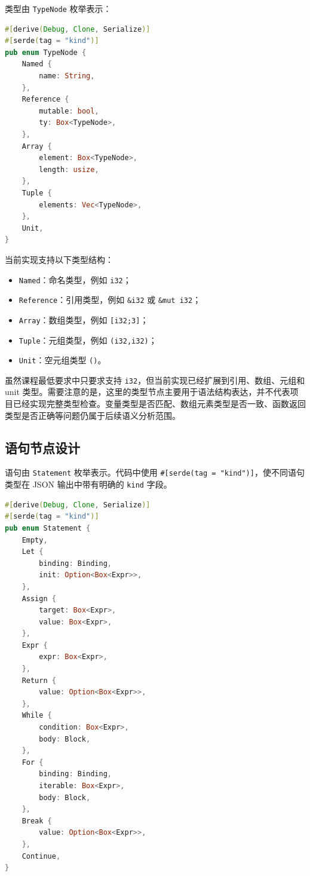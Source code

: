 \documentclass[UTF8,a4paper,12pt]{ctexart}
\begin{document}
类型由 \texttt{TypeNode} 枚举表示：

\begin{lstlisting}[language=Rust,caption={TypeNode 节点定义}]
#[derive(Debug, Clone, Serialize)]
#[serde(tag = "kind")]
pub enum TypeNode {
    Named {
        name: String,
    },
    Reference {
        mutable: bool,
        ty: Box<TypeNode>,
    },
    Array {
        element: Box<TypeNode>,
        length: usize,
    },
    Tuple {
        elements: Vec<TypeNode>,
    },
    Unit,
}
\end{lstlisting}

当前实现支持以下类型结构：

\begin{itemize}
    \item \texttt{Named}：命名类型，例如 \texttt{i32}；
    \item \texttt{Reference}：引用类型，例如 \texttt{\&i32} 或 \texttt{\&mut i32}；
    \item \texttt{Array}：数组类型，例如 \texttt{[i32;3]}；
    \item \texttt{Tuple}：元组类型，例如 \texttt{(i32,i32)}；
    \item \texttt{Unit}：空元组类型 \texttt{()}。
\end{itemize}

虽然课程最低要求中只要求支持 \texttt{i32}，但当前实现已经扩展到引用、数组、元组和 unit 类型。需要注意的是，这里的类型节点主要用于语法结构表达，并不代表项目已经实现完整类型检查。变量类型是否匹配、数组元素类型是否一致、函数返回类型是否正确等问题仍属于后续语义分析范围。

\subsection{语句节点设计}

语句由 \texttt{Statement} 枚举表示。代码中使用 \texttt{\#[serde(tag = "kind")]}，使不同语句类型在 JSON 输出中带有明确的 \texttt{kind} 字段。

\begin{lstlisting}[language=Rust,caption={Statement 节点定义}]
#[derive(Debug, Clone, Serialize)]
#[serde(tag = "kind")]
pub enum Statement {
    Empty,
    Let {
        binding: Binding,
        init: Option<Box<Expr>>,
    },
    Assign {
        target: Box<Expr>,
        value: Box<Expr>,
    },
    Expr {
        expr: Box<Expr>,
    },
    Return {
        value: Option<Box<Expr>>,
    },
    While {
        condition: Box<Expr>,
        body: Block,
    },
    For {
        binding: Binding,
        iterable: Box<Expr>,
        body: Block,
    },
    Break {
        value: Option<Box<Expr>>,
    },
    Continue,
}
\end{lstlisting}
\end{document}
